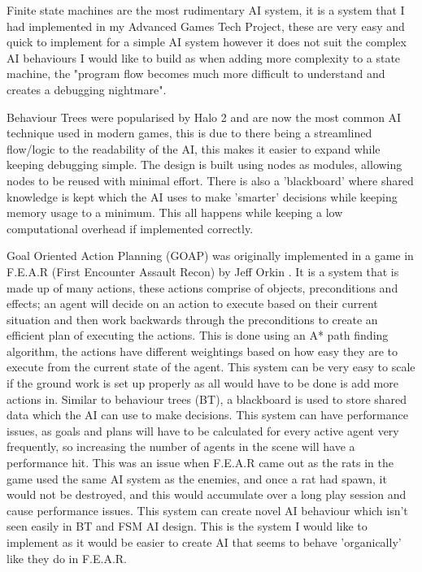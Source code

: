 \documentclass[10pt]{report}
\begin{document}
Finite state machines are the most rudimentary AI system, it is a system that I had implemented in my Advanced Games Tech Project, these are very easy and quick to implement for a simple AI system however it does not suit the complex AI behaviours I would like to build as when adding more complexity to a state machine, the "program flow becomes much more difficult to understand and creates a debugging nightmare"\cite{gameAiByExample}.

Behaviour Trees were popularised by Halo 2\cite{halo2} and are now the most common AI technique used in modern games, this is due to there being a streamlined flow/logic to the readability of the AI, this makes it easier to expand while keeping debugging simple. The design is built using nodes as modules, allowing nodes to be reused with minimal effort. There is also a 'blackboard' where shared knowledge is kept which the AI uses to make 'smarter' decisions while keeping memory usage to a minimum. This all happens while keeping a low computational overhead if implemented correctly. \cite{behaviourTrees}

Goal Oriented Action Planning (GOAP) was originally implemented in a game in F.E.A.R (First Encounter Assault Recon) by Jeff Orkin \cite{goap}. It is a system that is made up of many actions, these actions comprise of objects, preconditions and effects; an agent will decide on an action to execute based on their current situation and then work backwards through the preconditions to create an efficient plan of executing the actions. This is done using an A* path finding algorithm, the actions have different weightings based on how easy they are to execute from the current state of the agent. This system can be very easy to scale if the ground work is set up properly as all would have to be done is add more actions in. Similar to behaviour trees (BT), a blackboard is used to store shared data which the AI can use to make decisions. This system can have performance issues, as goals and plans will have to be calculated for every active agent very frequently, so increasing the number of agents in the scene will have a performance hit. This was an issue when F.E.A.R came out as the rats in the game used the same AI system as the enemies, and once a rat had spawn, it would not be destroyed, and this would accumulate over a long play session and cause performance issues. This system can create novel AI behaviour which isn't seen easily in BT and FSM AI design. This is the system I would like to implement as it would be easier to create AI that seems to behave 'organically' like they do in F.E.A.R. \cite{goapTommyTompson}
\end{document}
